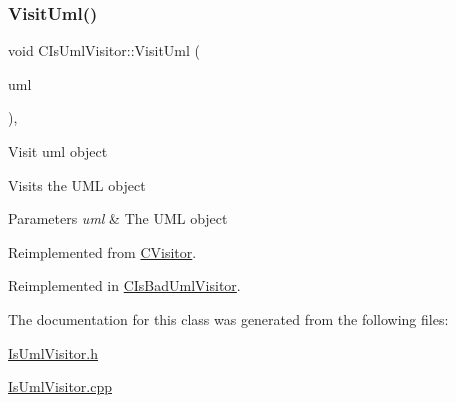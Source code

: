 \subsubsection{\texorpdfstring{VisitUml()}{VisitUml()}}
{\footnotesize\ttfamily void C\+Is\+Uml\+Visitor\+::\+Visit\+Uml (\begin{DoxyParamCaption}\item[{\mbox{\hyperlink{class_c_uml_box}{C\+Uml\+Box}} $\ast$}]{uml }\end{DoxyParamCaption})\hspace{0.3cm}{\ttfamily [override]}, {\ttfamily [virtual]}}

Visit uml object

Visits the U\+ML object 
\begin{DoxyParams}{Parameters}
{\em uml} & The U\+ML object \\
\hline
\end{DoxyParams}


Reimplemented from \mbox{\hyperlink{class_c_visitor_abf6343050ae9c2f2526fa6a17ec891a2}{C\+Visitor}}.



Reimplemented in \mbox{\hyperlink{class_c_is_bad_uml_visitor_a749753fc1c57d534faf60a016a4fd745}{C\+Is\+Bad\+Uml\+Visitor}}.



The documentation for this class was generated from the following files\+:\begin{DoxyCompactItemize}
\item 
\mbox{\hyperlink{_is_uml_visitor_8h}{Is\+Uml\+Visitor.\+h}}\item 
\mbox{\hyperlink{_is_uml_visitor_8cpp}{Is\+Uml\+Visitor.\+cpp}}\end{DoxyCompactItemize}
